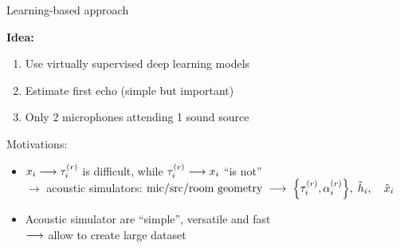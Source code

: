 \begin{frame}{\alert{Learning-based approach} \hfill\iconDNN}

    \pause
    \begin{mycontriblock}
        \textbf{Idea:}
        \begin{enumerate}
            \item Use \alert{virtually} supervised \alert{deep} learning models
            \item Estimate first echo (simple but important) 
            \item Only 2 microphones attending 1 sound source
        \end{enumerate}
    \end{mycontriblock}

    \pause
    \begin{block}{Motivations:}
        \begin{itemize}
            \item $x_i \longrightarrow \tau_i^{(r)}$ is difficult, while $\tau_i^{(r)} \longrightarrow x_i$ ``is not''
            \\$\rightarrow$ acoustic simulators:
                $\text{mic/src/room geometry}
                \; \longrightarrow \;
                \set{\tauir,\ampir}, \; \contRIR_i, \quad \contMic_i$
            \pause
            \item Acoustic simulator are ``simple'', versatile and fast
            \\$\longrightarrow$ allow to create large dataset
        \end{itemize}
    \end{block}

\end{frame}


